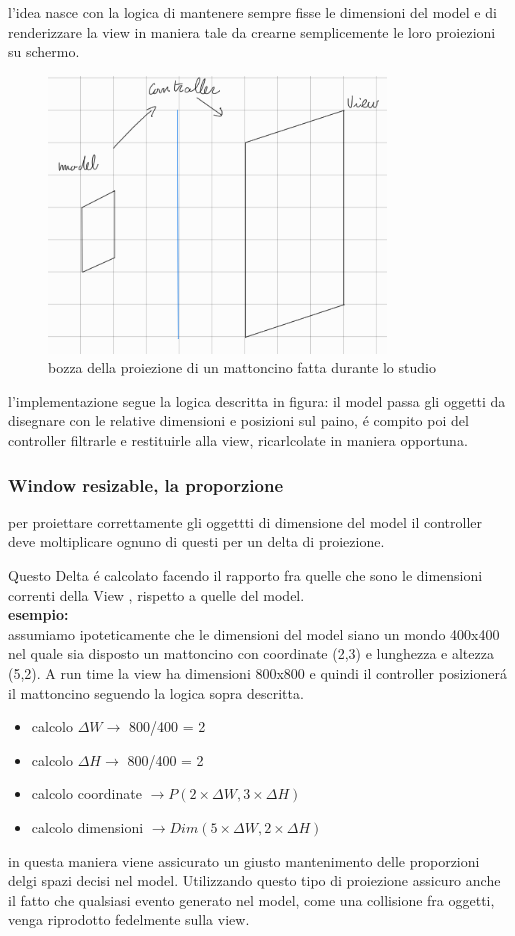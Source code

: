 \documentclass[a4paper,12pt]{report}
\begin{document}
l'idea nasce con la logica di mantenere sempre fisse le dimensioni del model
e di renderizzare la view in maniera tale da crearne semplicemente le loro proiezioni su schermo.
\begin{figure}[H]
    \centering
    \includegraphics[width=0.8\textwidth]{images/resizableConcept.png}
    \caption{bozza della proiezione di un mattoncino fatta durante lo studio}
\end{figure}
l'implementazione segue la logica descritta in figura: il model passa gli oggetti da disegnare con le
relative dimensioni e posizioni sul paino, é compito poi del controller filtrarle e restituirle alla view,
ricarlcolate in maniera opportuna.\\
\subsubsection{Window resizable, la proporzione}
per proiettare correttamente gli oggettti di dimensione del model il controller deve moltiplicare ognuno
di questi per un delta di proiezione.

Questo Delta é calcolato facendo il rapporto fra quelle che sono le dimensioni correnti della View , rispetto
a quelle del model.\\
\textbf{esempio:} \\
assumiamo ipoteticamente che le dimensioni del model siano un mondo 400x400 nel quale sia disposto un mattoncino
con coordinate (2,3) e lunghezza e altezza (5,2).
A run time la view ha dimensioni 800x800  e quindi il controller posizionerá il mattoncino seguendo la logica
sopra descritta.\\
\begin{itemize}
    \item calcolo $\Delta W \rightarrow$  800/400 = 2
    \item calcolo $\Delta H \rightarrow$  800/400 = 2
    \item calcolo coordinate $\rightarrow P(2 \times \Delta W, 3\times \Delta H)$
    \item calcolo dimensioni $\rightarrow Dim(5 \times \Delta W,2\times \Delta H)$
\end{itemize}
in questa maniera viene assicurato un giusto mantenimento delle proporzioni delgi spazi decisi nel model.
Utilizzando questo tipo di proiezione assicuro anche il fatto che qualsiasi evento generato nel model, come una
collisione fra oggetti, venga riprodotto fedelmente sulla view.
\end{document}
